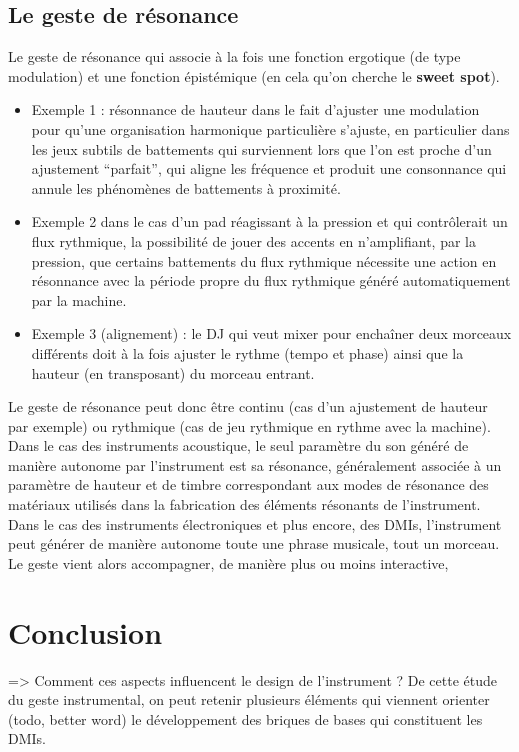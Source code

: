 \subsection{Le geste de résonance}

Le geste de résonance qui associe à la fois une fonction ergotique (de type modulation) et une fonction épistémique (en cela qu'on cherche le \textbf{sweet spot}). 
\vspace{-1em}
\begin{itemize}[noitemsep]
\item Exemple 1 : résonnance de hauteur dans le fait d'ajuster une modulation pour qu'une organisation harmonique particulière s'ajuste, en particulier dans les jeux subtils de battements qui surviennent lors que l'on est proche d'un ajustement ``parfait'', qui aligne les fréquence et produit une consonnance qui annule les phénomènes de battements à proximité.
\item Exemple 2 dans le cas d'un pad réagissant à la pression et qui contrôlerait un flux rythmique, la possibilité de jouer des accents en n'amplifiant, par la pression, que certains battements du flux rythmique nécessite une action en résonnance avec la période propre du flux rythmique généré automatiquement par la machine.
\item Exemple 3 (alignement) : le DJ qui veut mixer pour enchaîner deux morceaux différents doit à la fois ajuster le rythme (tempo et phase) ainsi que la hauteur (en transposant) du morceau entrant.
\end{itemize}

Le geste de résonance peut donc être continu (cas d'un ajustement de hauteur par exemple) ou rythmique (cas de jeu rythmique en rythme avec la machine).
Dans le cas des instruments acoustique, le seul paramètre du son généré de manière autonome par l'instrument est sa résonance, généralement associée à un paramètre de hauteur et de timbre correspondant aux modes de résonance des matériaux utilisés dans la fabrication des éléments résonants de l'instrument. Dans le cas des instruments électroniques et plus encore, des \glspl{DMI}, l'instrument peut générer de manière autonome toute une phrase musicale, tout un morceau. Le geste vient alors accompagner, de manière plus ou moins interactive, 




 
\section{Conclusion}
\label{sec:gesture:conclusion}
=> Comment ces aspects influencent le design de l’instrument ?
De cette étude du geste instrumental, on peut retenir plusieurs éléments qui viennent orienter (todo, better word) le développement des briques de bases qui constituent les DMIs.

